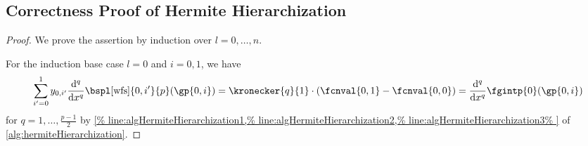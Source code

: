 \subsection{Correctness Proof of Hermite Hierarchization}
\label{sec:proofHermiteHierarchization}

\propInvariantHermiteHierarchization*

\begin{proof}
  We prove the assertion by induction over $l = 0, \dotsc, n$.
  
  For the induction base case $l = 0$ and $i = 0, 1$, we have
  \begin{equation}
    \sum_{i'=0}^1
    \linout{0,i'} \frac{\diff^q}{\dx^q} \bspl[\wfs]{0,i'}{p}(\gp{0,i})
    = \kronecker{q}{1} \cdot (\fcnval{0,1} - \fcnval{0,0})
    = \frac{\diff^q}{\dx^q} \fgintp{0}(\gp{0,i})
  \end{equation}
  for $q = 1, \dotsc, \frac{p-1}{2}$ by
  \cref{%
    line:algHermiteHierarchization1,%
    line:algHermiteHierarchization2,%
    line:algHermiteHierarchization3%
  }
  of \cref{alg:hermiteHierarchization}.
  

\end{proof}
